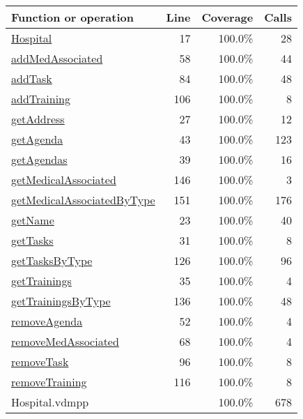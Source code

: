 \begin{longtable}{|l|r|r|r|}
\hline
Function or operation & Line & Coverage & Calls \\
\hline
\hline
\hyperref[Hospital:17]{Hospital} & 17&100.0\% & 28 \\
\hline
\hyperref[addMedAssociated:58]{addMedAssociated} & 58&100.0\% & 44 \\
\hline
\hyperref[addTask:84]{addTask} & 84&100.0\% & 48 \\
\hline
\hyperref[addTraining:106]{addTraining} & 106&100.0\% & 8 \\
\hline
\hyperref[getAddress:27]{getAddress} & 27&100.0\% & 12 \\
\hline
\hyperref[getAgenda:43]{getAgenda} & 43&100.0\% & 123 \\
\hline
\hyperref[getAgendas:39]{getAgendas} & 39&100.0\% & 16 \\
\hline
\hyperref[getMedicalAssociated:146]{getMedicalAssociated} & 146&100.0\% & 3 \\
\hline
\hyperref[getMedicalAssociatedByType:151]{getMedicalAssociatedByType} & 151&100.0\% & 176 \\
\hline
\hyperref[getName:23]{getName} & 23&100.0\% & 40 \\
\hline
\hyperref[getTasks:31]{getTasks} & 31&100.0\% & 8 \\
\hline
\hyperref[getTasksByType:126]{getTasksByType} & 126&100.0\% & 96 \\
\hline
\hyperref[getTrainings:35]{getTrainings} & 35&100.0\% & 4 \\
\hline
\hyperref[getTrainingsByType:136]{getTrainingsByType} & 136&100.0\% & 48 \\
\hline
\hyperref[removeAgenda:52]{removeAgenda} & 52&100.0\% & 4 \\
\hline
\hyperref[removeMedAssociated:68]{removeMedAssociated} & 68&100.0\% & 4 \\
\hline
\hyperref[removeTask:96]{removeTask} & 96&100.0\% & 8 \\
\hline
\hyperref[removeTraining:116]{removeTraining} & 116&100.0\% & 8 \\
\hline
\hline
Hospital.vdmpp & & 100.0\% & 678 \\
\hline
\end{longtable}

